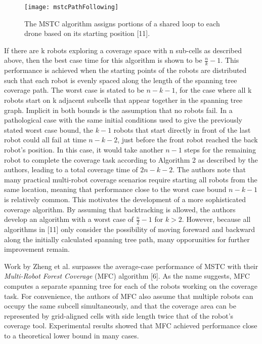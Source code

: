 \begin{figure}[H]
\texttt{[image: mstcPathFollowing]}
\caption[MSTC Path Following Behavior]{The MSTC algorithm assigns portions of a shared loop to each drone based on its starting position [11].}
\end{figure}

If there are k robots exploring a coverage space with n sub-cells as described above, then the best case time for this algorithm is shown to be $ \frac{n}{k} - 1 $. This performance is achieved when the starting points of the robots are distributed such that each robot is evenly spaced along the length of the spanning tree coverage path. The worst case is stated to be $ n - k - 1$, for the case where all k robots start on k adjacent subcells that appear together in the spanning tree graph. Implicit in both bounds is the assumption that no robots fail. In a pathological case with the same initial conditions used to give the previously stated worst case bound, the $ k - 1$ robots that start directly in front of the last robot could all fail at time $ n - k - 2$, just before the front robot reached the back robot's position. In this case, it would take another $n - 1$  steps for the remaining robot to complete the coverage task according to Algorithm 2 as described by the authors, leading to a total coverage time of $ 2 n - k - 2 $. The authors note that many practical multi-robot coverage scenarios require starting all robots from the same location, meaning that performance close to the worst case bound $ n - k - 1 $ is relatively common. This motivates the development of a more sophisticated coverage algorithm. By assuming that backtracking is allowed, the authors develop an algorithm with a worst case of $ \frac{n}{2} - 1 $ for $ k > 2 $. However, because all algorithms in [11] only consider the possibility of moving foreward and backward along the initially calculated spanning tree path, many opporunities for further improvement remain.

Work by Zheng et al. surpasses the average-case performance of MSTC with their \textit{Multi-Robot Forest Coverage} (MFC) algorithm [6]. As the name suggests, MFC computes a separate spanning tree for each of the robots working on the coverage task. For convenience, the authors of MFC also assume that multiple robots can occupy the same subcell simultaneously, and that the coverage area can be represented by grid-aligned cells with side length twice that of the robot's coverage tool. Experimental results showed that MFC achieved performance close to a theoretical lower bound in many cases.

